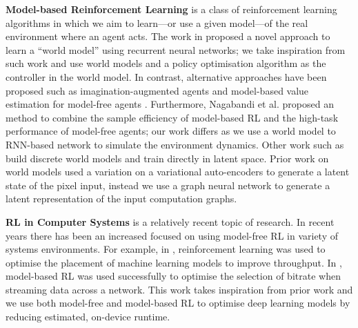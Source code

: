 

\textbf{Model-based Reinforcement Learning} is a class of reinforcement learning algorithms in which we aim to learn---or use a given model---of the real environment where an agent acts. The work in \cite{ha2018worldmodels} proposed a novel approach to learn a ``world model'' using recurrent neural networks; we take inspiration from such work and use world models and a policy optimisation algorithm as the controller in the world model. In contrast, alternative approaches have been proposed such as imagination-augmented agents \cite{weber2018imaginationaugmented} and model-based value estimation for model-free agents \cite{feinberg2018modelbased}. Furthermore, Nagabandi et al. \cite{nagabandi2017neural} proposed an method to combine the sample efficiency of model-based RL and the high-task performance of model-free agents; our work differs as we use a world model to RNN-based network to simulate the environment dynamics. Other work such as \cite{robine2021smaller, hafner2021mastering} build discrete world models and train directly in latent space. Prior work on world models used a variation on a variational auto-encoders \cite{ha2018worldmodels,hafner2020dream} to generate a latent state of the pixel input, instead we use a graph neural network \cite{battaglia2018relational} to generate a latent representation of the input computation graphs.

\textbf{RL in Computer Systems} is a relatively recent topic of research. In recent years there has been an increased focused on using model-free RL in variety of systems environments. For example, in \cite{mirhoseini2017device, mirhoseini2018hierarchical, addanki2019placeto, paliwal2020reinforced}, reinforcement learning was used to optimise the placement of machine learning models to improve throughput. In \cite{app10196685}, model-based RL was used successfully to optimise the selection of bitrate when streaming data across a network. This work takes inspiration from prior work and we use both model-free and model-based RL to optimise deep learning models by reducing estimated, on-device runtime.

